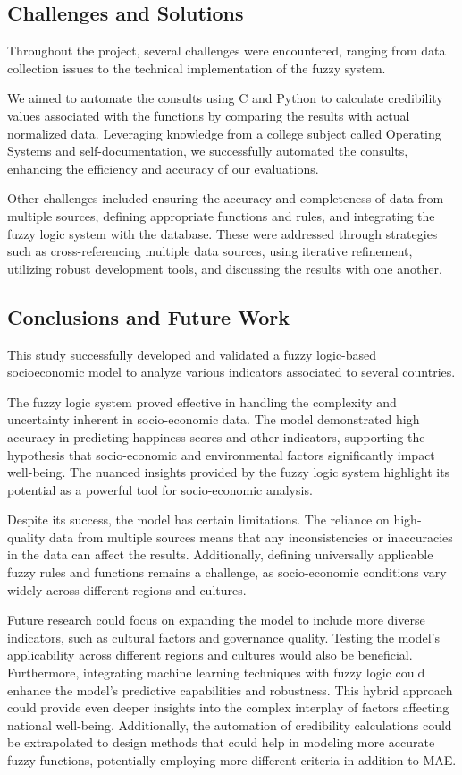 \documentclass[fleqn,11pt]{article}
\begin{document}
\subsection{Challenges and Solutions}

Throughout the project, several challenges were encountered, ranging from data collection issues to the technical implementation of the fuzzy system.

We aimed to automate the consults using C and Python to calculate credibility values associated with the functions by comparing the results with actual normalized data. Leveraging knowledge from a college subject called Operating Systems and self-documentation, we successfully automated the consults, enhancing the efficiency and accuracy of our evaluations.

Other challenges included ensuring the accuracy and completeness of data from multiple sources,
defining appropriate functions and rules, and integrating the fuzzy logic system with the database. These were addressed through strategies such as cross-referencing multiple data sources, using iterative refinement, utilizing robust development tools, and discussing the results with one another.

\subsection{Conclusions and Future Work}

This study successfully developed and validated a fuzzy logic-based socioeconomic model to analyze various indicators associated to several countries. 

The fuzzy logic system proved effective in handling the complexity and uncertainty inherent in socio-economic data. The model demonstrated high accuracy in predicting happiness scores and other indicators, supporting the hypothesis that socio-economic and environmental factors significantly impact well-being. The nuanced insights provided by the fuzzy logic system highlight its potential as a powerful tool for socio-economic analysis.

Despite its success, the model has certain limitations. The reliance on high-quality data from multiple sources means that any inconsistencies or inaccuracies in the data can affect the results. Additionally, defining universally applicable fuzzy rules and functions remains a challenge, as socio-economic conditions vary widely across different regions and cultures.

Future research could focus on expanding the model to include more diverse indicators, such as cultural factors and governance quality. Testing the model's applicability across different regions and cultures would also be beneficial. Furthermore, integrating machine learning techniques with fuzzy logic could enhance the model's predictive capabilities and robustness. This hybrid approach could provide even deeper insights into the complex interplay of factors affecting national well-being. Additionally, the automation of credibility calculations could be extrapolated to design methods that could help in modeling more accurate fuzzy functions, potentially employing more different criteria in addition to MAE.
\end{document}

